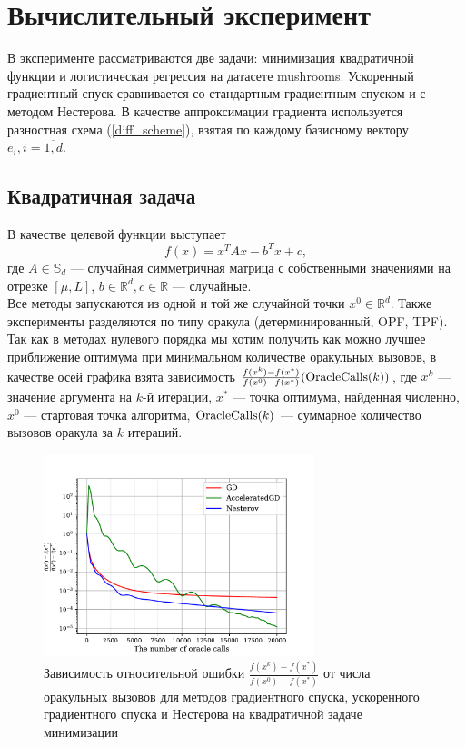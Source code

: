 \documentclass{article}
\newcommand{\R}{\mathbb{R}}
\begin{document}
\section{Вычислительный эксперимент}
В эксперименте рассматриваются две задачи: минимизация квадратичной функции и логистическая регрессия на датасете mushrooms. Ускоренный градиентный спуск сравнивается со стандартным градиентным спуском и с методом Нестерова. В качестве аппроксимации градиента используется разностная схема (\ref{diff_scheme}), взятая по каждому базисному вектору $e_i, i = \overline{1, d}$.
\subsection{Квадратичная задача}
В качестве целевой функции выступает
\begin{equation}
 f(x) = x^T A x - b^T x + c,
\end{equation}
где $A \in \mathbb{S}_d$ --- случайная симметричная матрица с собственными значениями на отрезке $[\mu, L]$, $b \in \R^d, c \in \R$ --- случайные.\\
Все методы запускаются из одной и той же случайной точки $x^0 \in \R^d$. Также эксперименты разделяются по типу оракула (детерминированный, OPF, TPF).\\
Так как в методах нулевого порядка мы хотим получить как можно лучшее приближение оптимума при минимальном количестве оракульных вызовов, в качестве осей графика взята зависимость $\frac{f(x^k) - f(x^*)}{f(x^0) - f(x^*)}(\textnormal{OracleCalls}(k))$, где $x^k$ --- значение аргумента на $k$-й итерации, $x^*$ --- точка оптимума, найденная численно, $x^0$ --- стартовая точка алгоритма, $\textnormal{OracleCalls}(k)$ --- суммарное количество вызовов оракула за $k$ итераций.
\begin{figure}[!htbp]
\centering
  \includegraphics[width=0.7\textwidth]{../figures/Non_stochastic_quadratic_GD_AGD_Nesterov.pdf}
 \caption{Зависимость относительной ошибки $\frac{f(x^k) - f(x^*)}{f(x^0) - f(x^*)}$ от числа оракульных вызовов для методов градиентного спуска, ускоренного градиентного спуска и Нестерова на квадратичной задаче минимизации}
  \label{fig:non-stochastic_logreg}
\end{figure}
\end{document}
